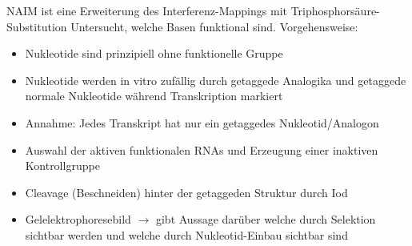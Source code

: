 NAIM ist eine Erweiterung des Interferenz-Mappings mit Triphosphorsäure-Substitution
Untersucht, welche Basen funktional sind. Vorgehensweise:
\begin{itemize}
\item Nukleotide sind prinzipiell ohne funktionelle Gruppe
\item Nukleotide werden in vitro zufällig durch getaggede Analogika und getaggede normale Nukleotide während Transkription markiert
\item Annahme: Jedes Transkript hat nur ein getaggedes Nukleotid/Analogon
\item Auswahl der aktiven funktionalen RNAs und Erzeugung einer inaktiven Kontrollgruppe
\item Cleavage (Beschneiden) hinter der getaggeden Struktur durch Iod
\item Gelelektrophoresebild $\rightarrow$ gibt Aussage darüber welche durch Selektion sichtbar werden und welche durch Nukleotid-Einbau sichtbar sind
\end{itemize}